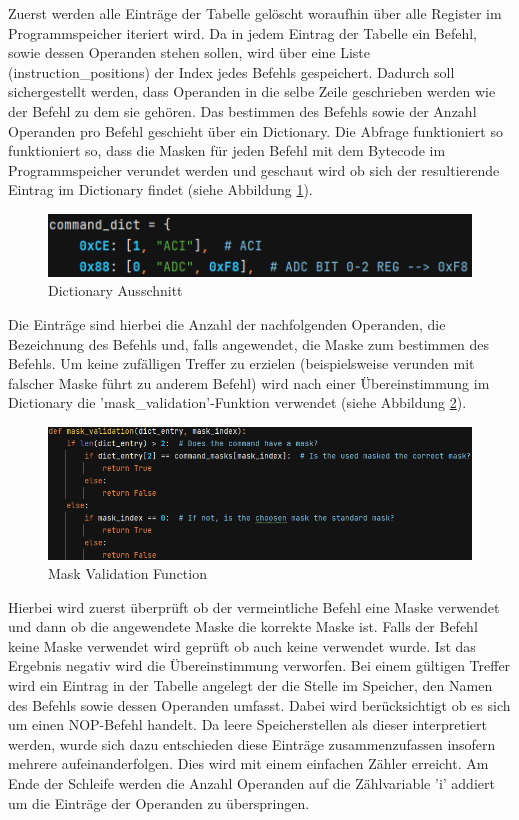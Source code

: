 \documentclass[12pt]{article}
\newcommand{\imgSpaceBefore}{\vspace{10pt}}
\begin{document}
\noindent
Zuerst werden alle Einträge der Tabelle gelöscht woraufhin über alle Register im Programmspeicher iteriert wird. Da in jedem Eintrag der Tabelle ein Befehl, sowie dessen Operanden stehen sollen, wird über eine Liste (instruction\_positions) der Index jedes Befehls gespeichert. Dadurch soll sichergestellt werden, dass Operanden in die selbe Zeile geschrieben werden wie der Befehl zu dem sie gehören. Das bestimmen des Befehls sowie der Anzahl Operanden pro Befehl geschieht über ein Dictionary. Die Abfrage funktioniert so funktioniert so, dass die Masken für jeden Befehl mit dem Bytecode im Programmspeicher verundet werden und geschaut wird ob sich der resultierende Eintrag im Dictionary findet (siehe Abbildung \ref{fig:Dict}).\imgSpaceBefore

\begin{figure}[H]
\centering
\includegraphics[width=12cm]{bilder/CmdDictExample}
\caption{Dictionary Ausschnitt}
\label{fig:Dict}
\end{figure}

\noindent
Die Einträge sind hierbei die Anzahl der nachfolgenden Operanden, die Bezeichnung des Befehls und, falls angewendet, die Maske zum bestimmen des Befehls. Um keine zufälligen Treffer zu erzielen (beispielsweise verunden mit falscher Maske führt zu anderem Befehl) wird nach einer Übereinstimmung im Dictionary die 'mask\_validation'-Funktion verwendet (siehe Abbildung \ref{fig:MaskValid}).\imgSpaceBefore

\begin{figure}[H]
\centering
\includegraphics[width=14cm]{bilder/mask_valid}
\caption{Mask Validation Function}
\label{fig:MaskValid}
\end{figure}

\noindent
Hierbei wird zuerst überprüft ob der vermeintliche Befehl eine Maske verwendet und dann ob die angewendete Maske die korrekte Maske ist. Falls der Befehl keine Maske verwendet wird geprüft ob auch keine verwendet wurde. Ist das Ergebnis negativ wird die Übereinstimmung verworfen. Bei einem gültigen Treffer wird ein Eintrag in der Tabelle angelegt der die Stelle im Speicher, den Namen des Befehls sowie dessen Operanden umfasst. Dabei wird berücksichtigt ob es sich um einen NOP-Befehl handelt. Da leere Speicherstellen als dieser interpretiert werden, wurde sich dazu entschieden diese Einträge zusammenzufassen insofern mehrere aufeinanderfolgen. Dies wird mit einem einfachen Zähler erreicht. Am Ende der Schleife werden die Anzahl Operanden auf die Zählvariable 'i' addiert um die Einträge der Operanden zu überspringen.
\end{document}
